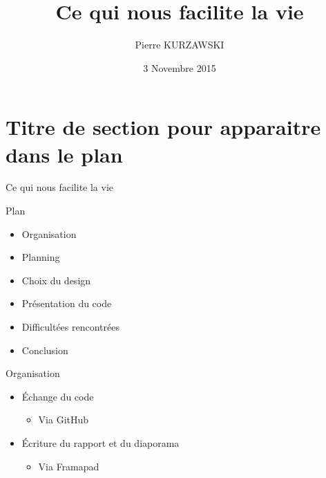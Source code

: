 \documentclass[]{beamer}
\title{Ce qui nous facilite la vie}
\author{Pierre KURZAWSKI}
\date{3 Novembre 2015}
\begin{document}
\maketitle

\section{Titre de section pour apparaitre dans le plan}
\begin{frame}{Ce qui nous facilite la vie}

  \begin{block}{Plan}
  \begin{itemize}
  \item Organisation
  \item Planning
  \item Choix du design
  \item Présentation du code
  \item Difficultées rencontrées
  \item Conclusion
  \end{itemize}
  \end{block}
\end{frame}

\begin{frame}{Organisation}
\end{frame}


  \begin{itemize}
  \item Échange du code
  \begin{itemize}
  \item Via GitHub
  \end{itemize}
  \end{itemize}

  \begin{itemize}
  \item Écriture du rapport et du diaporama
  \begin{itemize}
  \item Via Framapad
  \end{itemize}
  \end{itemize}
\end{document}
